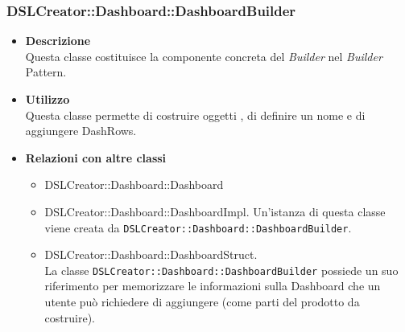                 \subsubsection{DSLCreator::Dashboard::DashboardBuilder}
                    \begin{itemize}
                        \item \textbf{Descrizione} \hfill \\
                            Questa classe costituisce la componente concreta del \textit{Builder} nel \textit{Builder} Pattern.
                        \item \textbf{Utilizzo} \hfill \\
                            Questa classe permette di costruire oggetti , di definire un nome e di aggiungere DashRows.
                        \item \textbf{Relazioni con altre classi}
                            \begin{itemize}
                              \item DSLCreator::Dashboard::Dashboard
                              \item DSLCreator::Dashboard::DashboardImpl. Un'istanza di questa classe viene creata da \texttt{DSLCreator::Dashboard::DashboardBuilder}.
                              \item DSLCreator::Dashboard::DashboardStruct. \\ La classe \texttt{DSLCreator::Dashboard::DashboardBuilder} possiede un suo riferimento per memorizzare le informazioni sulla Dashboard che un utente può richiedere di aggiungere (come parti del prodotto da costruire).
                            \end{itemize}
                    \end{itemize}

